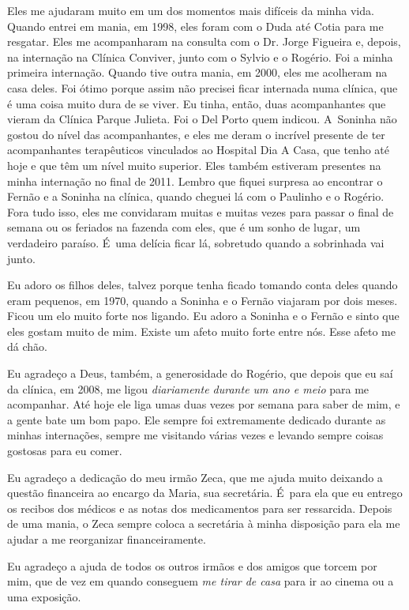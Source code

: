 Eles me ajudaram muito em um dos momentos mais difíceis da minha
vida. Quando entrei em mania, em 1998, eles foram com o Duda até Cotia
para me resgatar. Eles me acompanharam na consulta com o Dr. Jorge
Figueira e, depois, na internação na Clínica Conviver, junto com o
Sylvio e o Rogério. Foi a minha primeira internação. Quando tive outra
mania, em 2000, eles me acolheram na casa deles. Foi ótimo porque assim
não precisei ficar internada numa clínica, que é uma coisa muito dura de
se viver. Eu tinha, então, duas acompanhantes que vieram da Clínica
Parque Julieta. Foi o Del Porto quem indicou. A~Soninha não gostou do
nível das acompanhantes, e eles me deram o incrível presente de ter
acompanhantes terapêuticos vinculados ao Hospital Dia A Casa, que tenho
até hoje e que têm um nível muito superior. Eles também estiveram
presentes na minha internação no final de 2011. Lembro que fiquei
surpresa ao encontrar o Fernão e a Soninha na clínica, quando cheguei lá
com o Paulinho e o Rogério. Fora tudo isso, eles me convidaram muitas e
muitas vezes para passar o final de semana ou os feriados na fazenda com
eles, que é um sonho de lugar, um verdadeiro paraíso. É~uma delícia
ficar lá, sobretudo quando a sobrinhada vai junto.

Eu adoro os filhos deles, talvez porque tenha ficado tomando conta deles
quando eram pequenos, em 1970, quando a Soninha e o Fernão viajaram por
dois meses. Ficou um elo muito forte nos ligando. Eu adoro a Soninha e o
Fernão e sinto que eles gostam muito de mim. Existe um afeto muito forte
entre nós. Esse afeto me dá chão.

Eu agradeço a Deus, também, a generosidade do Rogério, que depois que eu
saí da clínica, em 2008, me ligou \emph{diariamente durante um ano e
meio} para me acompanhar. Até hoje ele liga umas duas vezes por semana
para saber de mim, e a gente bate um bom papo. Ele sempre foi
extremamente dedicado durante as minhas internações, sempre me visitando
várias vezes e levando sempre coisas gostosas para eu comer.

Eu agradeço a dedicação do meu irmão Zeca, que me ajuda muito deixando a
questão financeira ao encargo da Maria, sua secretária. É~para ela que
eu entrego os recibos dos médicos e as notas dos medicamentos para ser
ressarcida. Depois de uma mania, o Zeca sempre coloca a secretária à
minha disposição para ela me ajudar a me reorganizar financeiramente.

Eu agradeço a ajuda de todos os outros irmãos e dos amigos que torcem
por mim, que de vez em quando conseguem \emph{me tirar de casa} para ir
ao cinema ou a uma exposição.


